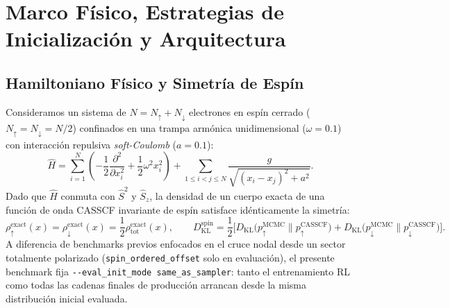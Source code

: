 \documentclass[10pt,a4paper]{article}
\begin{document}
\section{Marco F\'isico, Estrategias de Inicializaci\'on y Arquitectura}

\subsection{Hamiltoniano F\'isico y Simetr\'ia de Esp\'in}
Consideramos un sistema de $N = N_\uparrow + N_\downarrow$ electrones en esp\'in cerrado ($N_\uparrow = N_\downarrow = N/2$) confinados en una trampa arm\'onica unidimensional ($\omega = 0.1$) con interacci\'on repulsiva \textit{soft-Coulomb} ($a = 0.1$):
\begin{equation}
\hat{H} = \sum_{i=1}^{N} \left( -\frac{1}{2}\frac{\partial^2}{\partial x_i^2} + \frac{1}{2}\omega^2 x_i^2 \right) + \sum_{1 \le i < j \le N} \frac{g}{\sqrt{(x_i - x_j)^2 + a^2}}.
\end{equation}
Dado que $\hat{H}$ conmuta con $\hat{S}^2$ y $\hat{S}_z$, la densidad de un cuerpo exacta de una funci\'on de onda CASSCF invariante de esp\'in satisface id\'enticamente la simetr\'ia:
\begin{equation}
\rho_\uparrow^{\mathrm{exact}}(x) = \rho_\downarrow^{\mathrm{exact}}(x) = \frac{1}{2}\rho_{\mathrm{tot}}^{\mathrm{exact}}(x), \qquad D_{\mathrm{KL}}^{\mathrm{spin}} = \frac{1}{2}\Big[D_{\mathrm{KL}}\!\big(p_\uparrow^{\mathrm{MCMC}} \parallel p_\uparrow^{\mathrm{CASSCF}}\big) + D_{\mathrm{KL}}\!\big(p_\downarrow^{\mathrm{MCMC}} \parallel p_\downarrow^{\mathrm{CASSCF}}\big)\Big].
\end{equation}
A diferencia de benchmarks previos enfocados en el cruce nodal desde un sector totalmente polarizado (\texttt{spin\_ordered\_offset} solo en evaluaci\'on), el presente benchmark fija \texttt{-\/-eval\_init\_mode same\_as\_sampler}: tanto el entrenamiento RL como todas las cadenas finales de producci\'on arrancan desde la misma distribuci\'on inicial evaluada.
\end{document}
